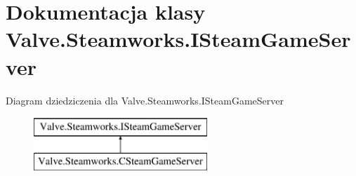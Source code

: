 \hypertarget{class_valve_1_1_steamworks_1_1_i_steam_game_server}{}\section{Dokumentacja klasy Valve.\+Steamworks.\+I\+Steam\+Game\+Server}
\label{class_valve_1_1_steamworks_1_1_i_steam_game_server}
Diagram dziedziczenia dla Valve.\+Steamworks.\+I\+Steam\+Game\+Server\begin{figure}[H]
\begin{center}
\leavevmode
\includegraphics[height=2.000000cm]{class_valve_1_1_steamworks_1_1_i_steam_game_server}
\end{center}
\end{figure}
